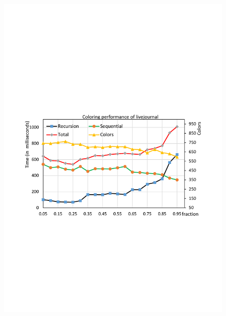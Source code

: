 \begin{figure}[t]
{		\includegraphics[scale=0.2]{figure/exp/livejournal.pdf}
	}
	\subfloat[RMAT]{
		\label{fig:rmat}
}
\end{figure}
